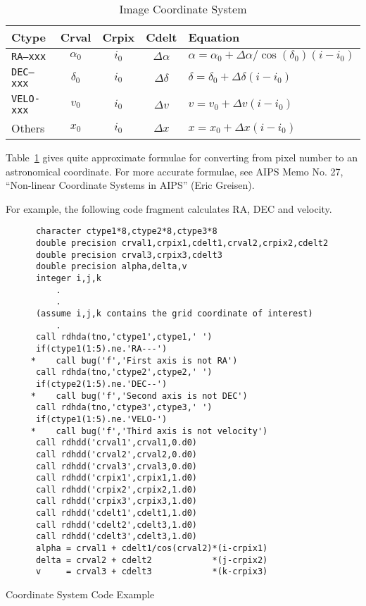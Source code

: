 \begin{table}\centering
\begin{tabular}{|lcccl|}\hline
Ctype & Crval & Crpix & Cdelt & Equation		\\ \hline
{\tt RA---xxx}& $\alpha_0$ & $i_0$ & $\Delta\alpha$ &
  $\alpha=\alpha_0+\Delta\alpha/\cos(\delta_0)(i-i_0)$	\\
{\tt DEC--xxx}& $\delta_0$ & $i_0$ & $\Delta\delta$ &
  $\delta=\delta_0+\Delta\delta(i-i_0)$			\\
{\tt VELO-xxx}& $v_0$ & $i_0$ & $\Delta v$ &
  $v=v_0+\Delta v(i-i_0)$				\\
Others& $x_0$ & $i_0$ & $\Delta x$ &
  $x=x_0+\Delta x(i-i_0)$				\\ \hline
\end{tabular}
\caption{Image Coordinate System}
\label{t:coord}
\end{table}

Table~\ref{t:coord} gives quite approximate formulae for converting from
pixel number to an astronomical coordinate. For more accurate formulae, see
AIPS Memo No. 27, ``Non-linear Coordinate Systems in AIPS'' (Eric Greisen).

For example, the following code fragment calculates RA, DEC and velocity.
\begin{table}
\begin{verbatim}
      character ctype1*8,ctype2*8,ctype3*8
      double precision crval1,crpix1,cdelt1,crval2,crpix2,cdelt2
      double precision crval3,crpix3,cdelt3
      double precision alpha,delta,v
      integer i,j,k
          .
          .
      (assume i,j,k contains the grid coordinate of interest)
          .
      call rdhda(tno,'ctype1',ctype1,' ')
      if(ctype1(1:5).ne.'RA---')
     *    call bug('f','First axis is not RA')
      call rdhda(tno,'ctype2',ctype2,' ')
      if(ctype2(1:5).ne.'DEC--')
     *    call bug('f','Second axis is not DEC')
      call rdhda(tno,'ctype3',ctype3,' ')
      if(ctype1(1:5).ne.'VELO-')
     *    call bug('f','Third axis is not velocity')
      call rdhdd('crval1',crval1,0.d0)
      call rdhdd('crval2',crval2,0.d0)
      call rdhdd('crval3',crval3,0.d0)
      call rdhdd('crpix1',crpix1,1.d0)
      call rdhdd('crpix2',crpix2,1.d0)
      call rdhdd('crpix3',crpix3,1.d0)
      call rdhdd('cdelt1',cdelt1,1.d0)
      call rdhdd('cdelt2',cdelt3,1.d0)
      call rdhdd('cdelt3',cdelt3,1.d0)
      alpha = crval1 + cdelt1/cos(crval2)*(i-crpix1)
      delta = crval2 + cdelt2            *(j-crpix2)
      v     = crval3 + cdelt3            *(k-crpix3)
\end{verbatim}
\caption{Coordinate System Code Example}
\end{table}

